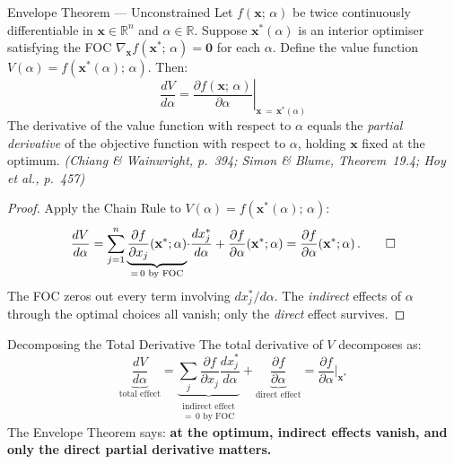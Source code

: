 \documentclass[12pt, a4paper]{article}
\theoremstyle{definition}
\newcommand{\R}{\mathbb{R}}
\newcommand{\bx}{\mathbf{x}}
\newcommand{\bz}{\mathbf{0}}
\newcommand{\ddd}[2]{\dfrac{d#1}{d#2}}
\newcommand{\pp}[2]{\dfrac{\partial #1}{\partial #2}}
\begin{document}
\begin{thmbox}{Envelope Theorem --- Unconstrained}
Let $f(\bx;\,\alpha)$ be twice continuously differentiable in $\bx \in \R^n$
and $\alpha \in \R$. Suppose $\bx^*(\alpha)$ is an interior optimiser
satisfying the FOC $\nabla_{\bx} f(\bx^*;\,\alpha) = \bz$ for each $\alpha$.
Define the value function $V(\alpha) = f(\bx^*(\alpha);\,\alpha)$.
Then:
\[
  \boxed{
    \ddd{V}{\alpha}
    = \left.\pp{f(\bx;\,\alpha)}{\alpha}\right|_{\bx\,=\,\bx^*(\alpha)}
  }
\]
The derivative of the value function with respect to $\alpha$ equals the
\emph{partial derivative} of the objective function with respect to $\alpha$,
holding $\bx$ fixed at the optimum.
\emph{(Chiang \& Wainwright, p.\ 394; Simon \& Blume, Theorem~19.4;
Hoy et al., p.\ 457)}
\end{thmbox}

\begin{proof}
Apply the Chain Rule to $V(\alpha) = f(\bx^*(\alpha);\,\alpha)$:
\[
  \ddd{V}{\alpha}
  = \sum_{j=1}^n \underbrace{\pp{f}{x_j}\!\left(\bx^*;\alpha\right)}_{=\,0\text{ by FOC}}
    \!\cdot\ddd{x_j^*}{\alpha}
    + \pp{f}{\alpha}\!\left(\bx^*;\alpha\right)
  = \pp{f}{\alpha}\!\left(\bx^*;\alpha\right). \qed
\]
The FOC zeros out every term involving $dx_j^*/d\alpha$. The
\emph{indirect} effects of $\alpha$ through the optimal choices all vanish;
only the \emph{direct} effect survives.
\end{proof}

\begin{keybox}{Decomposing the Total Derivative}
The total derivative of $V$ decomposes as:
\[
  \underbrace{\ddd{V}{\alpha}}_{\text{total effect}}
  = \underbrace{\sum_j \pp{f}{x_j}\ddd{x_j^*}{\alpha}}_{\substack{\text{indirect effect}\\=\,0\text{ by FOC}}}
    + \underbrace{\pp{f}{\alpha}}_{\text{direct effect}}
  = \pp{f}{\alpha}\bigg|_{\bx^*}
\]
The Envelope Theorem says: \textbf{at the optimum, indirect effects vanish,
and only the direct partial derivative matters.}
\end{keybox}
\end{document}
